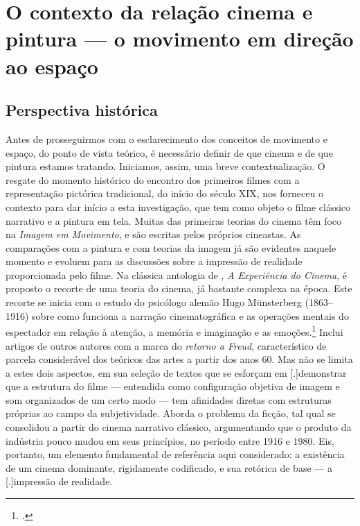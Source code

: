\chapter{O contexto da relação cinema e pintura --- o movimento em direção ao espaço}%
\label{cap1-contexto-relacao-cinema-pintura}
\pagestyle{headings}

\section{Perspectiva histórica}%
\label{sec-perspectiva-historica}

Antes de prosseguirmos com o esclarecimento dos conceitos de movimento
e espaço, do ponto de vista teórico, é necessário definir de que cinema
e de que pintura estamos tratando. Iniciamos, assim, uma breve
contextualização. O resgate do momento histórico do encontro dos
primeiros filmes com a representação pictórica tradicional, do início
do século XIX, nos forneceu o contexto para dar início a esta
investigação, que tem como objeto o filme clássico narrativo e a
pintura em tela. Muitas das primeiras teorias do cinema têm foco na
\emph{Imagem em Movimento}, e são escritas pelos próprios cineastas. As
comparações com a pintura e com teorias da imagem já são evidentes
naquele momento e evoluem para as discussões sobre a impressão de
realidade proporcionada pelo filme. 
Na clássica antologia de \textcite{xavier1983experiencia}, \emph{A
	Experiência do Cinema}, é proposto o recorte de uma teoria do cinema,
já bastante complexa na época. Este recorte se inicia com o estudo do
psicólogo alemão Hugo Münsterberg (1863--1916) sobre como funciona a
narração cinematográfica e as operações mentais do espectador em
relação à atenção, a memória e imaginação e as emoções.\footcite[Para
	saber mais sobre Münsterberg e Rudolf Arnhein, consulte][]
  {pedro2013percepcao} Inclui artigos de outros autores com a
marca do \emph{retorno a Freud}, característico de parcela considerável
dos teóricos das artes a partir dos anos 60. Mas
\textcite{xavier1983experiencia} não se limita a estes dois aspectos,
em sua seleção de textos que se esforçam em
[.]{demonstrar que a estrutura do
	filme --- entendida como configuração objetiva de imagem e som
	organizados de um certo modo --- tem afinidades diretas com estruturas
	próprias ao campo da subjetividade}. Aborda o problema da ficção, tal
qual se consolidou a partir do cinema narrativo clássico, argumentando
que o produto da indústria pouco mudou em seus princípios, no período
entre 1916 e 1980. Eis, portanto, um elemento fundamental de referência
aqui considerado: a existência de um cinema dominante, rigidamente
codificado, e sua retórica de base --- a
[.]{impressão de realidade}.

